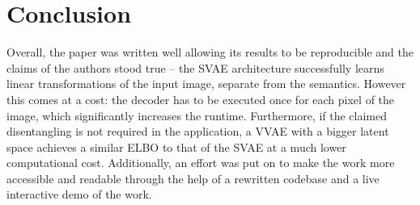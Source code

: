 \section{Conclusion} \label{conclusion}

Overall, the paper was written well allowing its results to be reproducible and the claims of the authors stood true -- the SVAE architecture successfully learns linear transformations of the input image, separate from the semantics. However this comes at a cost: the decoder has to be executed once for each pixel of the image, which significantly increases the runtime. Furthermore, if the claimed disentangling is not required in the application, a VVAE with a bigger latent space achieves a similar ELBO to that of the SVAE at a much lower computational cost. Additionally, an effort was put on to make the work more accessible and readable through the help of a rewritten codebase and a live interactive demo of the work.




